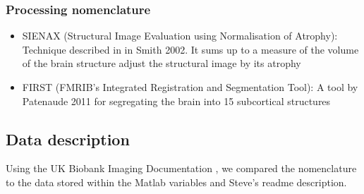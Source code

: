 \documentclass{article}
\begin{document}
\subsubsection{Processing nomenclature}
\begin{itemize}
\item SIENAX (Structural Image Evaluation using Normalisation of Atrophy): Technique described in in Smith 2002. It sums up to a measure of the volume of the brain structure adjust the structural image by its atrophy 
  \item FIRST (FMRIB's Integrated Registration and Segmentation Tool): A tool by Patenaude 2011 for segregating the brain into 15 subcortical structures
\end{itemize}

\subsection{Data description\label{data}}

Using the UK Biobank Imaging Documentation \cite{Smith2016}, we compared the nomenclature to the data stored within the Matlab variables and Steve's readme description.
\end{document}
